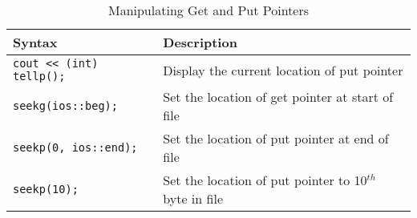 \documentclass[12pt,a4paper]{article}
\begin{document}
\begin{table}[H]
\begin{center}
\vspace{0.3cm}
	\begin{tabular}{lp{9cm}}
	\hline \hline
		\textbf{Syntax} \rule{0pt}{2.6ex} & \textbf{Description}\\
		\hline
		\verb|cout << (int) tellp();| \rule{0pt}{2.6ex} & Display the current location of put pointer\\
		\verb|seekg(ios::beg);| \rule{0pt}{2.6ex} & Set the location of get pointer at start of file\\
		\verb|seekp(0, ios::end);| \rule{0pt}{2.6ex} & Set the location of put pointer at end of file\\
		\verb|seekp(10);| \rule{0pt}{2.6ex} & Set the location of put pointer to 10$^{th}$ byte in file\\
	\hline \hline
	\end{tabular}
\end{center}
\label{ManipulatingGetandPutPointers}
\caption{Manipulating Get and Put Pointers}
\end{table}
\end{document}
